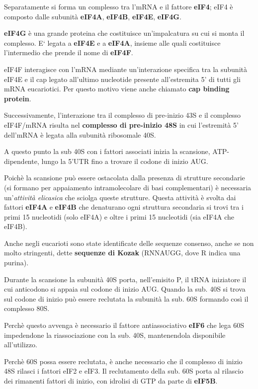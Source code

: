 \documentclass[]{article}
\begin{document}
Separatamente si forma un complesso tra l'mRNA e il fattore
\textbf{eIF4}; eIF4 è composto dalle subunità \textbf{eIF4A},
\textbf{eIF4B}, \textbf{eIF4E}, \textbf{eIF4G}.

\textbf{eIF4G} è una grande proteina che costituisce un'impalcatura su
cui si monta il complesso. E` legata a \textbf{eIF4E} e a
\textbf{eIF4A}, insieme alle quali costituisce l'intermedio che prende
il nome di \textbf{eIF4F}.

eIF4F interagisce con l'mRNA mediante un'interazione specifica tra la
subunità eIF4E e il cap legato all'ultimo nucleotide presente
all'estremita 5' di tutti gli mRNA eucariotici. Per questo motivo viene
anche chiamato \textbf{cap binding protein}.

Successivamente, l'interazione tra il complesso di pre-inizio 43S e il
complesso eIF4F/mRNA risulta nel \textbf{complesso di pre-inizio 48S} in
cui l'estremità 5' dell'mRNA è legata alla subunità ribosomale 40S.

A questo punto la sub 40S con i fattori associati inizia la scansione,
ATP-dipendente, lungo la 5'UTR fino a trovare il codone di inizio AUG.

Poichè la scansione può essere ostacolata dalla presenza di strutture
secondarie (si formano per appaiamento intramolecolare di basi
complementari) è necessaria un'\emph{attività elicasica} che sciolga
queste strutture. Questa attività è svolta dai fattori \textbf{eIF4A} e
\textbf{eIF4B} che denaturano ogni struttura secondaria si trovi tra i
primi 15 nucleotidi (solo eIF4A) e oltre i primi 15 nucleotidi (sia
eIF4A che eIF4B).

Anche negli eucarioti sono state identificate delle sequenze consenso,
anche se non molto stringenti, dette \textbf{sequenze di Kozak}
(RNNAUGG, dove R indica una purina).

Durante la scansione la subunità 40S porta, nell'emisito P, il tRNA
iniziatore il cui anticodono si appaia sul codone di inizio AUG. Quando
la sub. 40S si trova sul codone di inizio può essere reclutata la
subunità la sub. 60S formando così il complesso 80S.

Perchè questo avvenga è necessario il fattore antiassociativo
\textbf{eIF6} che lega 60S impedendone la riassociazione con la sub.
40S, mantenendola disponibile all'utilizzo.

Perchè 60S possa essere reclutata, è anche necessario che il complesso
di inizio 48S rilasci i fattori eIF2 e eIF3. Il reclutamento della sub.
60S porta al rilascio dei rimanenti fattori di inizio, con idrolisi di
GTP da parte di \textbf{eIF5B}.
\end{document}
